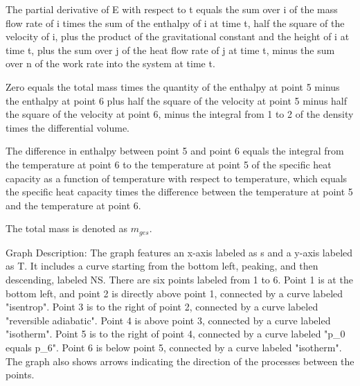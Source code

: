 The partial derivative of E with respect to t equals the sum over i of the mass flow rate of i times the sum of the enthalpy of i at time t, half the square of the velocity of i, plus the product of the gravitational constant and the height of i at time t, plus the sum over j of the heat flow rate of j at time t, minus the sum over n of the work rate into the system at time t.

Zero equals the total mass times the quantity of the enthalpy at point 5 minus the enthalpy at point 6 plus half the square of the velocity at point 5 minus half the square of the velocity at point 6, minus the integral from 1 to 2 of the density times the differential volume.

The difference in enthalpy between point 5 and point 6 equals the integral from the temperature at point 6 to the temperature at point 5 of the specific heat capacity as a function of temperature with respect to temperature, which equals the specific heat capacity times the difference between the temperature at point 5 and the temperature at point 6.

The total mass is denoted as \( m_{ges} \).

Graph Description:
The graph features an x-axis labeled as s and a y-axis labeled as T. It includes a curve starting from the bottom left, peaking, and then descending, labeled NS. There are six points labeled from 1 to 6. Point 1 is at the bottom left, and point 2 is directly above point 1, connected by a curve labeled "isentrop". Point 3 is to the right of point 2, connected by a curve labeled "reversible adiabatic". Point 4 is above point 3, connected by a curve labeled "isotherm". Point 5 is to the right of point 4, connected by a curve labeled "p_0 equals p_6". Point 6 is below point 5, connected by a curve labeled "isotherm". The graph also shows arrows indicating the direction of the processes between the points.